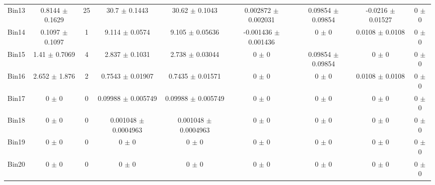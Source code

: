 \begin{tabular}{@{\extracolsep{4pt}}lcccccccc@{}}
     Bin13 & 0.8144 $\pm$ 0.1629 & 25 & 30.7 $\pm$ 0.1443 & 30.62 $\pm$ 0.1043 & 0.002872 $\pm$ 0.002031 & 0.09854 $\pm$ 0.09854 & -0.0216 $\pm$ 0.01527 & 0 $\pm$ 0 \\ 
     Bin14 & 0.1097 $\pm$ 0.1097 & 1 & 9.114 $\pm$ 0.0574 & 9.105 $\pm$ 0.05636 & -0.001436 $\pm$ 0.001436 & 0 $\pm$ 0 & 0.0108 $\pm$ 0.0108 & 0 $\pm$ 0 \\ 
     Bin15 & 1.41 $\pm$ 0.7069 & 4 & 2.837 $\pm$ 0.1031 & 2.738 $\pm$ 0.03044 & 0 $\pm$ 0 & 0.09854 $\pm$ 0.09854 & 0 $\pm$ 0 & 0 $\pm$ 0 \\ 
     Bin16 & 2.652 $\pm$ 1.876 & 2 & 0.7543 $\pm$ 0.01907 & 0.7435 $\pm$ 0.01571 & 0 $\pm$ 0 & 0 $\pm$ 0 & 0.0108 $\pm$ 0.0108 & 0 $\pm$ 0 \\ 
     Bin17 & 0 $\pm$ 0 & 0 & 0.09988 $\pm$ 0.005749 & 0.09988 $\pm$ 0.005749 & 0 $\pm$ 0 & 0 $\pm$ 0 & 0 $\pm$ 0 & 0 $\pm$ 0 \\ 
     Bin18 & 0 $\pm$ 0 & 0 & 0.001048 $\pm$ 0.0004963 & 0.001048 $\pm$ 0.0004963 & 0 $\pm$ 0 & 0 $\pm$ 0 & 0 $\pm$ 0 & 0 $\pm$ 0 \\ 
     Bin19 & 0 $\pm$ 0 & 0 & 0 $\pm$ 0 & 0 $\pm$ 0 & 0 $\pm$ 0 & 0 $\pm$ 0 & 0 $\pm$ 0 & 0 $\pm$ 0 \\ 
     Bin20 & 0 $\pm$ 0 & 0 & 0 $\pm$ 0 & 0 $\pm$ 0 & 0 $\pm$ 0 & 0 $\pm$ 0 & 0 $\pm$ 0 & 0 $\pm$ 0 \\ 
\hline\hline
  \end{tabular}
